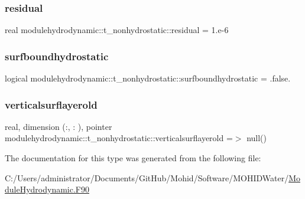 \subsubsection{\texorpdfstring{residual}{residual}}
{\footnotesize\ttfamily real modulehydrodynamic\+::t\+\_\+nonhydrostatic\+::residual = 1.e-\/6\hspace{0.3cm}{\ttfamily [private]}}

\mbox{\label{structmodulehydrodynamic_1_1t__nonhydrostatic_ac6a081415980e6d6d833665ae6aa5a28}} 
\subsubsection{\texorpdfstring{surfboundhydrostatic}{surfboundhydrostatic}}
{\footnotesize\ttfamily logical modulehydrodynamic\+::t\+\_\+nonhydrostatic\+::surfboundhydrostatic = .false.\hspace{0.3cm}{\ttfamily [private]}}

\mbox{\label{structmodulehydrodynamic_1_1t__nonhydrostatic_a8e708e7a8add6b6aab07e3ed26b7f2d9}} 
\subsubsection{\texorpdfstring{verticalsurflayerold}{verticalsurflayerold}}
{\footnotesize\ttfamily real, dimension (\+:, \+:   ), pointer modulehydrodynamic\+::t\+\_\+nonhydrostatic\+::verticalsurflayerold =$>$ null()\hspace{0.3cm}{\ttfamily [private]}}



The documentation for this type was generated from the following file\+:\begin{DoxyCompactItemize}
\item 
C\+:/\+Users/administrator/\+Documents/\+Git\+Hub/\+Mohid/\+Software/\+M\+O\+H\+I\+D\+Water/\mbox{\hyperlink{_module_hydrodynamic_8_f90}{Module\+Hydrodynamic.\+F90}}\end{DoxyCompactItemize}
